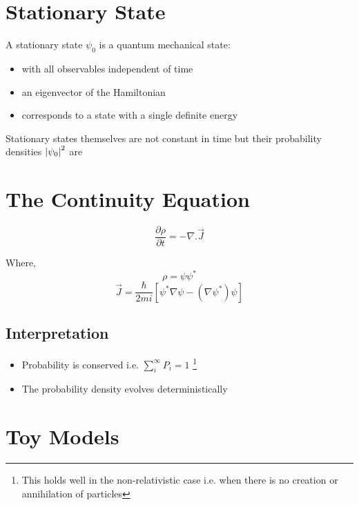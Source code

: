 \section{Stationary State}
A  stationary state $\psi_{0}$ is a quantum mechanical state:
\begin{itemize}
\item with all observables independent of time
\item an eigenvector of the Hamiltonian
\item corresponds to a state with a single definite energy
\end{itemize}
Stationary states themselves are not constant in time but their probability densities $\abs{\psi_{0}}^{2}$ are
\section{The Continuity Equation}
\begin{tcolorbox}
\begin{equation}
\frac{\partial \rho}{\partial t} = - \nabla . \vec{J}
\end{equation}
\end{tcolorbox}
Where,
$$\rho = \psi \psi^{*}$$
$$\vec{J} = \frac{\hbar}{2mi} \left[ \psi^{*} \nabla \psi - (\nabla \psi^{*})\psi\right]$$

\subsection{Interpretation}
\begin{itemize}
\item Probability is conserved i.e. $\sum_{i}^{\infty}P_{i} = 1$ \footnote{This holds well in the non-relativistic case i.e. when there is no creation or annihilation of particles}
\item The probability density evolves deterministically
\end{itemize}
\section{Toy Models}
